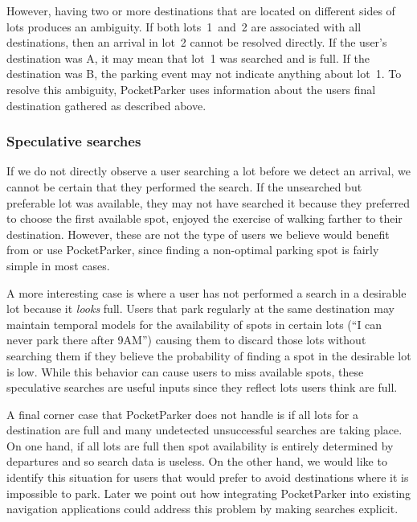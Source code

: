 \documentclass{sigchi}
\begin{document}
However, having two or more destinations that are located on different sides of
lots produces an ambiguity.  If both lots~1~and~2 are associated with all
destinations, then an arrival in lot~2 cannot be resolved directly. If the
user's destination was A, it may mean that lot~1 was searched and is full.
If the destination was B, the parking event may not indicate anything about
lot~1. To resolve this ambiguity, PocketParker uses information about the users
final destination gathered as described above.

\subsubsection{Speculative searches}

If we do not directly observe a user searching a lot before we detect an
arrival, we cannot be certain that they performed the search. If the unsearched
but preferable lot was available, they may not have searched it because they
preferred to choose the first available spot, enjoyed the exercise of walking
farther to their destination. However, these are not the type of users we
believe would benefit from or use PocketParker, since finding a
non-optimal parking spot is fairly simple in most cases.

A more interesting case is where a user has not performed a search in a
desirable lot because it \textit{looks} full. Users that park regularly at
the same destination may maintain temporal models for the availability of
spots in certain lots (``I can never park there after 9AM'') causing them to
discard those lots without searching them if they believe the probability of
finding a spot in the desirable lot is low. While this behavior can cause
users to miss available spots, these speculative searches are useful inputs
since they reflect lots users think are full.

A final corner case that PocketParker does not handle is if all lots for a
destination are full and many undetected unsuccessful searches are taking
place. On one hand, if all lots are full then spot availability is entirely
determined by departures and so search data is useless. On the other hand, we
would like to identify this situation for users that would prefer to avoid
destinations where it is impossible to park. Later we point out how
integrating PocketParker into existing navigation applications could address
this problem by making searches explicit.
\end{document}
